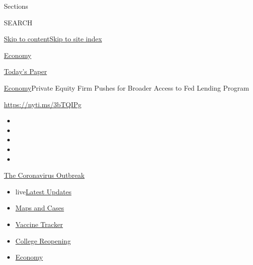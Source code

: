 Sections

SEARCH

\protect\hyperlink{site-content}{Skip to
content}\protect\hyperlink{site-index}{Skip to site index}

\href{https://www.nytimes3xbfgragh.onion/section/business/economy}{Economy}

\href{https://myaccount.nytimes3xbfgragh.onion/auth/login?response_type=cookie\&client_id=vi}{}

\href{https://www.nytimes3xbfgragh.onion/section/todayspaper}{Today's
Paper}

\href{/section/business/economy}{Economy}\textbar{}Private Equity Firm
Pushes for Broader Access to Fed Lending Program

\url{https://nyti.ms/3bTQIPg}

\begin{itemize}
\item
\item
\item
\item
\item
\end{itemize}

\href{https://www.nytimes3xbfgragh.onion/news-event/coronavirus?action=click\&pgtype=Article\&state=default\&region=TOP_BANNER\&context=storylines_menu}{The
Coronavirus Outbreak}

\begin{itemize}
\tightlist
\item
  live\href{https://www.nytimes3xbfgragh.onion/2020/08/03/world/coronavirus-covid-19.html?action=click\&pgtype=Article\&state=default\&region=TOP_BANNER\&context=storylines_menu}{Latest
  Updates}
\item
  \href{https://www.nytimes3xbfgragh.onion/interactive/2020/us/coronavirus-us-cases.html?action=click\&pgtype=Article\&state=default\&region=TOP_BANNER\&context=storylines_menu}{Maps
  and Cases}
\item
  \href{https://www.nytimes3xbfgragh.onion/interactive/2020/science/coronavirus-vaccine-tracker.html?action=click\&pgtype=Article\&state=default\&region=TOP_BANNER\&context=storylines_menu}{Vaccine
  Tracker}
\item
  \href{https://www.nytimes3xbfgragh.onion/2020/08/02/us/covid-college-reopening.html?action=click\&pgtype=Article\&state=default\&region=TOP_BANNER\&context=storylines_menu}{College
  Reopening}
\item
  \href{https://www.nytimes3xbfgragh.onion/live/2020/08/03/business/stock-market-today-coronavirus?action=click\&pgtype=Article\&state=default\&region=TOP_BANNER\&context=storylines_menu}{Economy}
\end{itemize}

